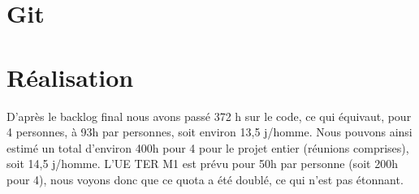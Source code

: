 \section{Git}


\section{Réalisation}
D'après le backlog final nous avons passé 372 h sur le code, ce qui équivaut, pour 4 personnes, à 93h par personnes, soit environ 13,5 j/homme.
Nous pouvons ainsi estimé un total d'environ 400h pour 4 pour le projet entier (réunions comprises), soit 14,5 j/homme.
L'UE TER M1 est prévu pour 50h par personne (soit 200h pour 4), nous voyons donc que ce quota a été doublé, ce qui n'est pas étonnant.
